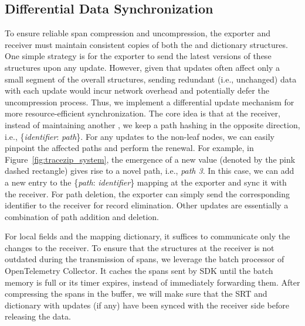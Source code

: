 \subsection{Differential Data Synchronization}
\label{sec:differential_sync}

To ensure reliable span compression and uncompression, the exporter and receiver must maintain consistent copies of both the \sname and dictionary structures.
One simple strategy is for the exporter to send the latest versions of these structures upon any update.
However, given that updates often affect only a small segment of the overall structures, sending redundant (i.e., unchanged) data with each update would incur network overhead and potentially defer the uncompression process.
Thus, we implement a differential update mechanism for more resource-efficient synchronization.
The core idea is that at the receiver, instead of maintaining another \sname, we keep a path hashing in the opposite direction, i.e., \{\textit{identifier}: \textit{path}\}.
For any updates to the non-leaf nodes, we can easily pinpoint the affected paths and perform the renewal.
For example, in Figure~\ref{fig:tracezip_system}, the emergence of a new value (denoted by the pink dashed rectangle) gives rise to a novel path, i.e., \textit{path 3}.
In this case, we can add a new entry to the \{\textit{path}: \textit{identifier}\} mapping at the exporter and sync it with the receiver.
For path deletion, the exporter can simply send the corresponding identifier to the receiver for record elimination.
Other updates are essentially a combination of path addition and deletion.

For local fields and the mapping dictionary, it suffices to communicate only the changes to the receiver.
To ensure that the structures at the receiver is not outdated during the transmission of spans, we leverage the batch processor of OpenTelemetry Collector.
It caches the spans sent by SDK until the batch memory is full or its timer expires, instead of immediately forwarding them.
After compressing the spans in the buffer, we will make sure that the SRT and dictionary with updates (if any) have been synced with the receiver side before releasing the data.


